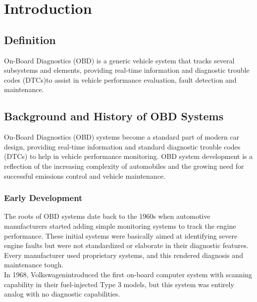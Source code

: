 \documentclass[12pt,a4paper]{report}
\begin{document}
\begin{abstract}

\end{abstract}


\chapter{Introduction}

\section{Definition}

\hspace*{1cm}On-Board Diagnostics (OBD) is a generic vehicle system that tracks several subsystems and elements, providing real-time
information and diagnostic trouble codes (DTCs)\footnotemark[1] to assist in vehicle performance evaluation, fault detection and maintenance.

\setlength{\skip\footins}{20pt} %

\section{Background and History of OBD Systems}

\hspace*{1cm}On-Board Diagnostics (OBD) systems become a standard part of modern car design, providing real-time information and standard diagnostic trouble codes (DTCs) to help in vehicle performance monitoring. OBD system development is a reflection of the increasing complexity of automobiles and the growing need for successful emissions control and vehicle maintenance.

\subsection{Early Development}

\hspace*{1cm}The roots of OBD systems date back to the 1960s when automotive manufacturers started adding simple monitoring systems to track the engine performance. These initial systems were basically aimed at identifying severe engine faults but were not standardized or elaborate in their diagnostic features. Every manufacturer used proprietary systems, and this rendered diagnosis and maintenance tough.
\\\hspace*{1cm}In 1968, Volkswagen\footnotemark[2] introduced the first on-board computer system with scanning capability in their fuel-injected Type 3 models, but this system was entirely analog with no diagnostic capabilities.
\end{document}
